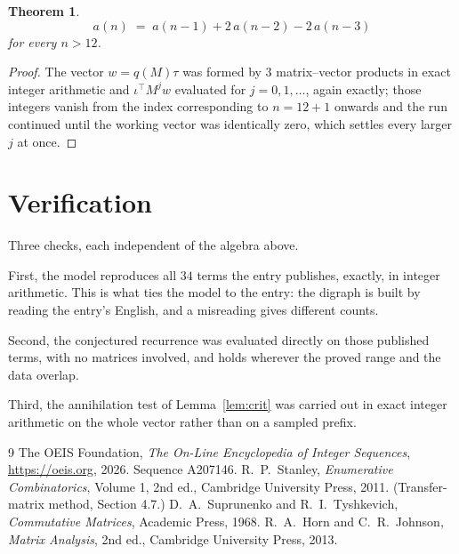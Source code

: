 \documentclass[11pt,a4paper]{article}
\theoremstyle{plain}
\newtheorem{theorem}{Theorem}
\theoremstyle{definition}
\begin{document}
\begin{theorem}
\[
a(n)\;=\;a(n-1) + 2\,a(n-2) - 2\,a(n-3)
\]
for every $n>12$.
\end{theorem}

\begin{proof}
The vector $w=q(M)\tau$ was formed by $3$ matrix--vector products in exact integer
arithmetic and $\iota^{\!\top}M^{j}w$ evaluated for $j=0,1,\dots$, again exactly; those
integers vanish from the index corresponding to $n=12+1$ onwards and the run continued
until the working vector was identically zero, which settles every larger $j$ at once.
\end{proof}

\section{Verification}

Three checks, each independent of the algebra above.

First, the model reproduces all $34$ terms the entry publishes, exactly, in integer
arithmetic. This is what ties the model to the entry: the digraph is built by reading the
entry's English, and a misreading gives different counts.

Second, the conjectured recurrence was evaluated directly on those published terms, with no
matrices involved, and holds wherever the proved range and the data overlap.

Third, the annihilation test of Lemma~\ref{lem:crit} was carried out in exact integer
arithmetic on the whole vector rather than on a sampled prefix.

\begin{thebibliography}{9}
 The OEIS Foundation, \emph{The On-Line Encyclopedia of Integer
Sequences}, \url{https://oeis.org}, 2026. Sequence A207146.
 R.~P.~Stanley, \emph{Enumerative Combinatorics}, Volume 1, 2nd ed.,
Cambridge University Press, 2011. (Transfer-matrix method, Section 4.7.)
 D.~A.~Suprunenko and R.~I.~Tyshkevich, \emph{Commutative Matrices},
Academic Press, 1968.
 R.~A.~Horn and C.~R.~Johnson, \emph{Matrix Analysis}, 2nd ed., Cambridge
University Press, 2013.
\end{thebibliography}
\end{document}
